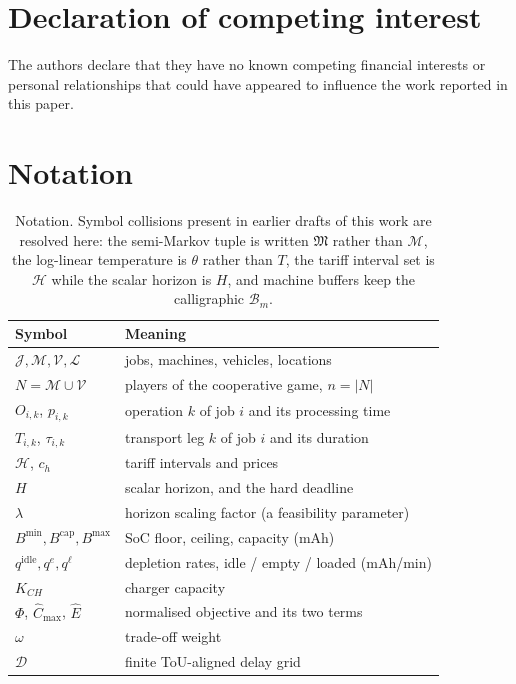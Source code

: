 \documentclass[preprint, 3p, review, 12pt]{elsarticle}
\theoremstyle{definition}
\begin{document}
\section*{Declaration of competing interest}
The authors declare that they have no known competing financial interests or personal
relationships that could have appeared to influence the work reported in this paper.

\appendix

\section{Notation}
\label{app:notation}
\begin{table}[h!]
\centering
\small
\caption{Notation. Symbol collisions present in earlier drafts of this work are resolved
here: the semi-Markov tuple is written $\mathfrak{M}$ rather than $\mathcal{M}$, the
log-linear temperature is $\theta$ rather than $T$, the tariff interval set is $\mathcal{H}$
while the scalar horizon is $H$, and machine buffers keep the calligraphic
$\mathcal{B}_m$.}
\label{tab:notation}
\begin{tabular}{@{}ll@{}}
\toprule
Symbol & Meaning \\
\midrule
$\mathcal{J},\mathcal{M},\mathcal{V},\mathcal{L}$ & jobs, machines, vehicles, locations \\
$N=\mathcal{M}\cup\mathcal{V}$ & players of the cooperative game, $n=|N|$ \\
$O_{i,k}$, $p_{i,k}$ & operation $k$ of job $i$ and its processing time \\
$T_{i,k}$, $\tau_{i,k}$ & transport leg $k$ of job $i$ and its duration \\
$\mathcal{H}$, $c_h$ & tariff intervals and prices \\
$H$ & scalar horizon, and the hard deadline \\
$\lambda$ & horizon scaling factor (a feasibility parameter) \\
$B^{\min},B^{\mathrm{cap}},B^{\max}$ & SoC floor, ceiling, capacity (mAh) \\
$q^{\mathrm{idle}},q^{e},q^{\ell}$ & depletion rates, idle / empty / loaded (mAh/min) \\
$K_{CH}$ & charger capacity \\
$\Phi$, $\widehat{C}_{\max}$, $\widehat{E}$ & normalised objective and its two terms \\
$\omega$ & trade-off weight \\
$\mathcal{D}$ & finite ToU-aligned delay grid \\

\end{tabular}
\end{table}
\end{document}
